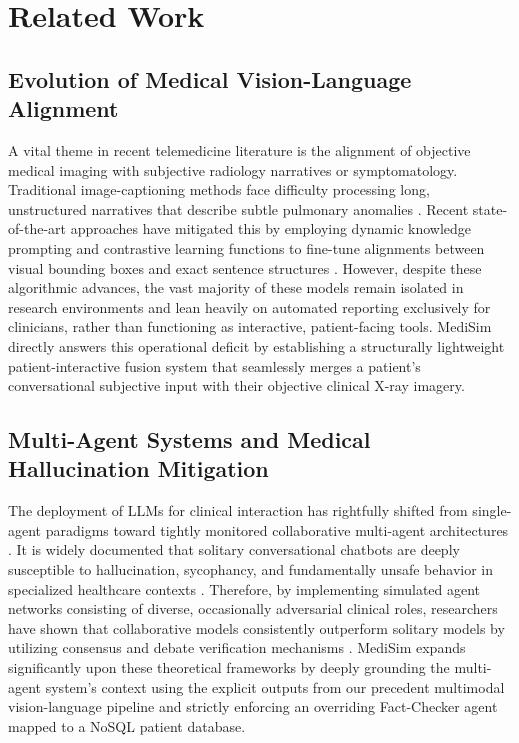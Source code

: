 \documentclass[11pt,a4paper]{article}
\begin{document}
\section{Related Work}

\subsection{Evolution of Medical Vision-Language Alignment}
A vital theme in recent telemedicine literature is the alignment of objective medical imaging with subjective radiology narratives or symptomatology. Traditional image-captioning methods face difficulty processing long, unstructured narratives that describe subtle pulmonary anomalies \citep{liu2021contrastive}. Recent state-of-the-art approaches have mitigated this by employing dynamic knowledge prompting and contrastive learning functions to fine-tune alignments between visual bounding boxes and exact sentence structures \citep{bu2024dynamic, wang2023fine}. However, despite these algorithmic advances, the vast majority of these models remain isolated in research environments and lean heavily on automated reporting exclusively for clinicians, rather than functioning as interactive, patient-facing tools. MediSim directly answers this operational deficit by establishing a structurally lightweight patient-interactive fusion system that seamlessly merges a patient's conversational subjective input with their objective clinical X-ray imagery.

\subsection{Multi-Agent Systems and Medical Hallucination Mitigation}
The deployment of LLMs for clinical interaction has rightfully shifted from single-agent paradigms toward tightly monitored collaborative multi-agent architectures \citep{lu2024triageagent}. It is widely documented that solitary conversational chatbots are deeply susceptible to hallucination, sycophancy, and fundamentally unsafe behavior in specialized healthcare contexts \citep{sahu2025occutriage, wu2025kamac}. Therefore, by implementing simulated agent networks consisting of diverse, occasionally adversarial clinical roles, researchers have shown that collaborative models consistently outperform solitary models by utilizing consensus and debate verification mechanisms \citep{fan2025aihospital}. MediSim expands significantly upon these theoretical frameworks by deeply grounding the multi-agent system’s context using the explicit outputs from our precedent multimodal vision-language pipeline and strictly enforcing an overriding Fact-Checker agent mapped to a NoSQL patient database.
\end{document}
